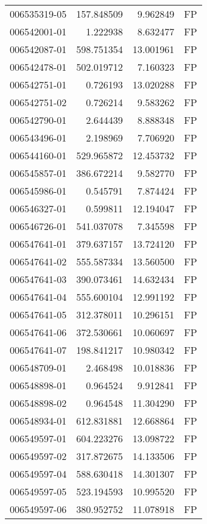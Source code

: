 \begin{tabular}{lrrl}
006535319-05 &  157.848509 &     9.962849 &   FP \\
006542001-01 &    1.222938 &     8.632477 &   FP \\
006542087-01 &  598.751354 &    13.001961 &   FP \\
006542478-01 &  502.019712 &     7.160323 &   FP \\
006542751-01 &    0.726193 &    13.020288 &   FP \\
006542751-02 &    0.726214 &     9.583262 &   FP \\
006542790-01 &    2.644439 &     8.888348 &   FP \\
006543496-01 &    2.198969 &     7.706920 &   FP \\
006544160-01 &  529.965872 &    12.453732 &   FP \\
006545857-01 &  386.672214 &     9.582770 &   FP \\
006545986-01 &    0.545791 &     7.874424 &   FP \\
006546327-01 &    0.599811 &    12.194047 &   FP \\
006546726-01 &  541.037078 &     7.345598 &   FP \\
006547641-01 &  379.637157 &    13.724120 &   FP \\
006547641-02 &  555.587334 &    13.560500 &   FP \\
006547641-03 &  390.073461 &    14.632434 &   FP \\
006547641-04 &  555.600104 &    12.991192 &   FP \\
006547641-05 &  312.378011 &    10.296151 &   FP \\
006547641-06 &  372.530661 &    10.060697 &   FP \\
006547641-07 &  198.841217 &    10.980342 &   FP \\
006548709-01 &    2.468498 &    10.018836 &   FP \\
006548898-01 &    0.964524 &     9.912841 &   FP \\
006548898-02 &    0.964548 &    11.304290 &   FP \\
006548934-01 &  612.831881 &    12.668864 &   FP \\
006549597-01 &  604.223276 &    13.098722 &   FP \\
006549597-02 &  317.872675 &    14.133506 &   FP \\
006549597-04 &  588.630418 &    14.301307 &   FP \\
006549597-05 &  523.194593 &    10.995520 &   FP \\
006549597-06 &  380.952752 &    11.078918 &   FP \\

\end{tabular}
